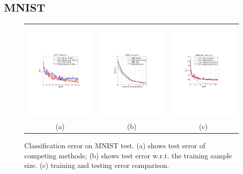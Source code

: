 \documentclass{article} %
\begin{document}
\subsection{MNIST}
\vspace{-1mm}
\begin{figure}[ht]
\begin{center}
\begin{tabular}{ccc}
\hspace{-5mm}			\includegraphics[width=0.3\linewidth, height=0.3\linewidth]{Fig2a.pdf} &
\hspace{-5mm}			\includegraphics[width=0.3\linewidth]{Fig2b.pdf} &
\hspace{-5mm}			\includegraphics[width=0.3\linewidth]{Fig2c.pdf}\\
			(a) & (b) & (c) \\
\end{tabular}
\vspace{-3mm}
\caption{Classification error on MNIST test. (a) shows test error of competing methods; (b) shows test error w.r.t. the training sample size. (c) training and testing error comparison.}
\label{fig:mnist}
\end{center}
\vspace{-5mm}
\end{figure}
\end{document}
